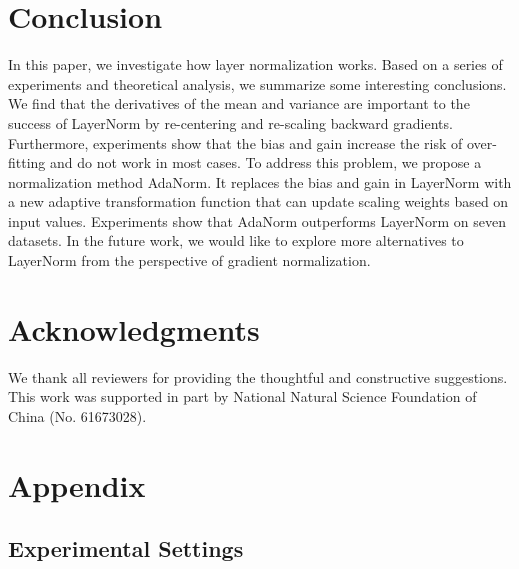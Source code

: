 \documentclass{article}
\begin{document}
\section{Conclusion}
In this paper, we investigate how layer normalization works.  Based on a series of experiments and theoretical analysis, we summarize some interesting conclusions. 
We find that the derivatives of the mean and variance are important to the success of LayerNorm by re-centering and re-scaling backward gradients. Furthermore, experiments show that the bias and gain increase the risk of over-fitting and do not work in most cases. To address this problem, we propose a normalization method AdaNorm. It replaces the bias and gain in LayerNorm with a new adaptive transformation function that can update scaling weights based on input values.
Experiments show that AdaNorm outperforms LayerNorm on seven datasets. In the future work, we would like to explore more alternatives to LayerNorm from the perspective of gradient normalization.


\section*{Acknowledgments}

We thank all reviewers for providing the thoughtful and constructive suggestions. This work was supported
in part by National Natural Science Foundation of
China (No. 61673028).  













\clearpage

\section{Appendix}
\subsection{Experimental Settings}
\end{document}
